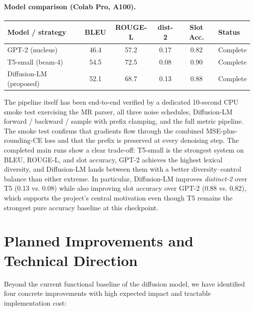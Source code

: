 \documentclass[11pt,a4paper]{article}
\begin{document}
\paragraph{Model comparison (Colab Pro, A100).}

\begin{center}
\renewcommand{\arraystretch}{1.2}
\begin{tabular}{l c c c c l}
\toprule
\textbf{Model / strategy} & \textbf{BLEU} & \textbf{ROUGE-L} & \textbf{dist-2} & \textbf{Slot Acc.} & \textbf{Status} \\
\midrule
GPT-2 (nucleus)         & 46.4 & 57.2 & 0.17 & 0.82 & Complete \\
T5-small (beam-4)       & 54.5 & 72.5 & 0.08 & 0.90 & Complete \\
Diffusion-LM (proposed) & 52.1 & 68.7 & 0.13 & 0.88 & Complete \\
\bottomrule
\end{tabular}
\end{center}

The pipeline itself has been end-to-end verified by a dedicated 10-second
CPU smoke test exercising the MR parser, all three noise schedules,
Diffusion-LM forward / backward / sample with prefix clamping, and the full
metric pipeline. The smoke test confirms that gradients flow through the
combined MSE-plus-rounding-CE loss and that the prefix is preserved at every
denoising step. The completed main runs show a clear trade-off: T5-small is
the strongest system on BLEU, ROUGE-L, and slot accuracy, GPT-2 achieves the
highest lexical diversity, and Diffusion-LM lands between them with a better
diversity--control balance than either extreme. In particular, Diffusion-LM
improves \emph{distinct-2} over T5 (0.13 vs. 0.08) while also improving slot
accuracy over GPT-2 (0.88 vs. 0.82), which supports the project's central
motivation even though T5 remains the strongest pure accuracy baseline at
this checkpoint.

\section{Planned Improvements and Technical Direction}

Beyond the current functional baseline of the diffusion model, we have
identified four concrete improvements with high expected impact and tractable
implementation cost:
\end{document}
